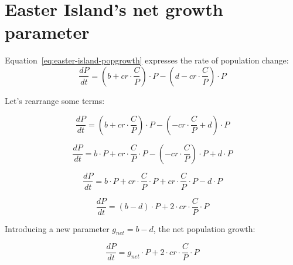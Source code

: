 \chapter[Easter Island's net growth parameter]{\chapterFontsize Easter Island's net growth parameter}
\label{ch:easter-island-net-growth-parameter}

Equation~\ref{eq:easter-island-popgrowth} expresses the rate of population change:
\begin{equation}
\frac{dP}{dt} = (b+cr\cdot{}\frac{C}{P})\cdot{}P-(d-cr\cdot{}\frac{C}{P})\cdot{P}
\end{equation}

Let's rearrange some terms:

\begin{equation}
\frac{dP}{dt} = (b+cr\cdot{}\frac{C}{P})\cdot{}P-(-cr\cdot{}\frac{C}{P}+d)\cdot{}P
\end{equation}

\begin{equation}
\frac{dP}{dt} = b\cdot{}P+cr\cdot{}\frac{C}{P}\cdot{}P-(-cr\cdot{}\frac{C}{P})\cdot{}P+d\cdot{}P
\end{equation}

\begin{equation}
\frac{dP}{dt} = b\cdot{}P+cr\cdot{}\frac{C}{P}\cdot{}P+cr\cdot{}\frac{C}{P}\cdot{}P-d\cdot{}P
\end{equation}

\begin{equation}
\frac{dP}{dt} = (b-d)\cdot{}P+2\cdot{}cr\cdot{}\frac{C}{P}\cdot{}P
\end{equation}


Introducing a new parameter $g_{net}=b-d$, the net population growth:

\begin{equation}
\frac{dP}{dt} = g_{net}\cdot{}P+2\cdot{}cr\cdot{}\frac{C}{P}\cdot{}P
\end{equation}
